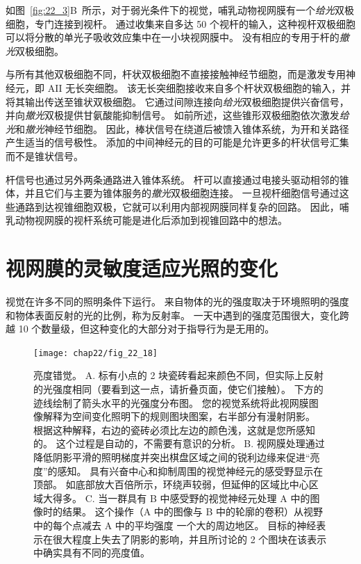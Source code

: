 如图~\ref{fig:22_3}B~所示，对于弱光条件下的视觉，哺乳动物视网膜有一个\textit{给光}双极细胞，专门连接到视杆。
通过收集来自多达 50 个视杆的输入，这种视杆双极细胞可以将分散的单光子吸收效应集中在一小块视网膜中。 
没有相应的专用于杆的\textit{撤光}双极细胞。


与所有其他双极细胞不同，杆状双极细胞不直接接触神经节细胞，而是激发专用神经元，即 AII 无长突细胞。
该无长突细胞接收来自多个杆状双极细胞的输入，并将其输出传送至锥状双极细胞。
它通过间隙连接向\textit{给光}双极细胞提供兴奋信号，并向\textit{撤光}双极提供甘氨酸能抑制信号。
如前所述，这些锥形双极细胞依次激发\textit{给光}和\textit{撤光}神经节细胞。
因此，棒状信号在绕道后被馈入锥体系统，为开和关路径产生适当的信号极性。
添加的中间神经元的目的可能是允许更多的杆状信号汇集而不是锥状信号。


杆信号也通过另外两条通路进入锥体系统。
杆可以直接通过电接头驱动相邻的锥体，并且它们与主要为锥体服务的\textit{撤光}双极细胞连接。
一旦视杆细胞信号通过这些通路到达视锥细胞双极，它就可以利用内部视网膜同样复杂的回路。
因此，哺乳动物视网膜的视杆系统可能是进化后添加到视锥回路中的想法。



\section{视网膜的灵敏度适应光照的变化}

视觉在许多不同的照明条件下运行。
来自物体的光的强度取决于环境照明的强度和物体表面反射的光的比例，称为反射率。
一天中遇到的强度范围很大，变化跨越 10 个数量级，但这种变化的大部分对于指导行为是无用的。


\begin{figure}[htbp]
	\centering
	\texttt{[image: chap22/fig\_22\_18]}
	\caption{亮度错觉。 
		A. 标有小点的 2 块瓷砖看起来颜色不同，但实际上反射的光强度相同（要看到这一点，请折叠页面，使它们接触）。
		下方的迹线绘制了箭头水平的光强度分布图。 
		您的视觉系统将此视网膜图像解释为空间变化照明下的规则图块图案，右半部分有漫射阴影。 
		根据这种解释，右边的瓷砖必须比左边的颜色浅，这就是您所感知的。
		这个过程是自动的，不需要有意识的分析。 
		B. 视网膜处理通过降低阴影平滑的照明梯度并突出棋盘区域之间的锐利边缘来促进“亮度”的感知。 
		具有兴奋中心和抑制周围的视觉神经元的感受野显示在顶部。 
		如底部放大百倍所示，环绕声较弱，但延伸的区域比中心区域大得多。
		C. 当一群具有 B 中感受野的视觉神经元处理 A 中的图像时的结果。
		这个操作（A 中的图像与 B 中的轮廓的卷积）从视野中的每个点减去 A 中的平均强度 一个大的周边地区。
		目标的神经表示在很大程度上失去了阴影的影响，并且所讨论的 2 个图块在该表示中确实具有不同的亮度值。}
	\label{fig:22_18}
\end{figure}



